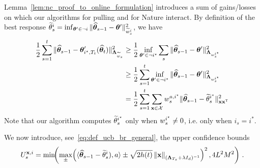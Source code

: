 Lemma~\ref{lem:nc_proof_to_online_formulation} introduces a sum of gains/losses on which our algorithms for pulling and for Nature interact.
By definition of the best response $\widetilde{\bf \theta}_s^i = \inf_{{\boldsymbol \theta}' \in \neg i} \Vert \widehat{{\boldsymbol \theta}}_{s-1} - {\boldsymbol \theta}' \Vert_{\widetilde{w}_s^i}^2$, we have
\begin{align}
\frac{1}{2}\sum_{s=1}^t  \Vert \widehat{{\boldsymbol \theta}}_{s-1} - {\boldsymbol \theta}'_{i^\star,T_t}(\widehat{{\boldsymbol \theta}}_t)\Vert_{{\boldsymbol \Lambda}_{\widetilde{w}_s}}^2
&\ge \frac{1}{2} \inf_{{\boldsymbol \theta}' \in \neg i^\star} \sum_s \Vert \widehat{{\boldsymbol \theta}}_{s-1} - {\boldsymbol \theta}'\Vert_{{\boldsymbol \Lambda}_{w_s^{i^\star}}}^2
\nonumber\\
&\geq \frac{1}{2}\sum_{s=1}^t \inf_{{\boldsymbol \theta}' \in \neg i^\star} \Vert \widehat{{\boldsymbol \theta}}_{s-1} - {\boldsymbol \theta}'\Vert_{{\boldsymbol \Lambda}_{w_s^{i^\star}}}^2
\nonumber\\
&= \frac{1}{2}\sum_{s=1}^t \sum_{{\bf x}\in\mathcal{X}} w_s^{a,i^\star}\Vert \widehat{{\boldsymbol \theta}}_{s-1} - \widetilde{\bf \theta}_s^{i^\star}\Vert_{{\bf x}{\bf x}^\mathsf{\scriptscriptstyle T}}^2\label{eq:only_istar}
\end{align}
Note that our algorithm computes $\widetilde{\bf \theta}_s^{i^\star}$ only when $w_s^{i^\star} \neq 0$, i.e. only when $i_s = i^*$.

We now introduce, see~\eqref{eq:def_ucb_br_general}, the upper confidence bounds
\[
    U_s^{{\bf x},i} = \min\!\!\left(\max_\pm\! \left( \langle \widehat{{\boldsymbol \theta}}_{s-1} - \widetilde{\bf \theta}^{i}_s), a\rangle \pm \sqrt{2 h(t)} \left\lVert{\bf x}\right\rVert_{({\boldsymbol \Lambda}_{T_s}+\lambda I_d)^{-1} } \right)^2,4L^2M^2\right)\,.
\]

